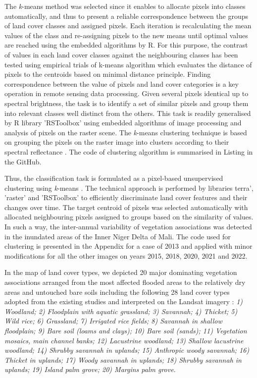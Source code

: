 \documentclass[12pt,a4paper,oneside]{article}
\def \newpar{\vspace{6pt}}
\begin{document}
\newpar The \emph{k}-means method was selected since it enables to allocate pixels into classes automatically, and thus to present a reliable correspondence between the groups of land cover classes and assigned pixels. Each iteration is recalculating the mean values of the class and re-assigning pixels to the new means until optimal values are reached using the embedded algorithms by R. For this purpose, the contrast of values in each land cover classes against the neighbouring classes has been tested using empirical trials of k-means algorithm which evaluates the distance of pixels to the centroids based on minimal distance principle. Finding correspondence between the value of pixels and land cover categories is a key operation in remote sensing data processing. Given several pixels identical up to spectral brightness, the task is to identify a set of similar pixels and group them into relevant classes well distinct from the others. This task is readily generalised by R library 'RSToolbox' using embedded algorithms of image processing and analysis of pixels on the raster scene. The \emph{k}-means clustering technique is based on grouping the pixels on the raster image into clusters according to their spectral reflectance \citep{Richards2022,OSE201657}. The code of clustering algorithm is summarised in Listing in the GitHub.

\newpar Thus, the classification task is formulated as a pixel-based unsupervised clustering using \emph{k}-means \citep{Sreevalsan}. The technical approach is performed by libraries terra', 'raster' and 'RSToolbox' to efficiently discriminate land cover features and their changes over time. The target centroid of pixels was selected automatically with allocated neighbouring pixels assigned to groups based on the similarity of values. In such a way, the inter-annual variability of vegetation associations was detected in the inundated areas of the Inner Niger Delta of Mali. The code used for clustering is presented in the Appendix for a case of 2013 and applied with minor modifications for all the other images on years 2015, 2018, 2020, 2021 and 2022.

\newpar In the map of land cover types, we depicted 20 major dominating vegetation associations arranged from the most affected flooded areas to the relatively dry areas and untouched bare soils including the following 28 land cover types adopted from the existing studies and interpreted on the Landsat imagery \cite{Marie}: \emph{1) Woodland; 2) Floodplain with aquatic grassland; 3) Savannah; 4) Thicket; 5) Wild rice; 6) Grassland; 7) Irrigated rice fields; 8) Savannah in shallow floodplain; 9) Bare soil (loams and clays); 10) Bare soil (sands); 11) Vegetation mosaics, main channel banks; 12) Lacustrine woodland; 13) Shallow lacustrine woodland; 14) Shrubby savannah in uplands; 15) Anthropic woody savannah; 16) Thicket in uplands; 17) Woody savannah in uplands; 18) Shrubby savannah in uplands; 19) Island palm grove; 20) Margins palm grove}.
\end{document}
